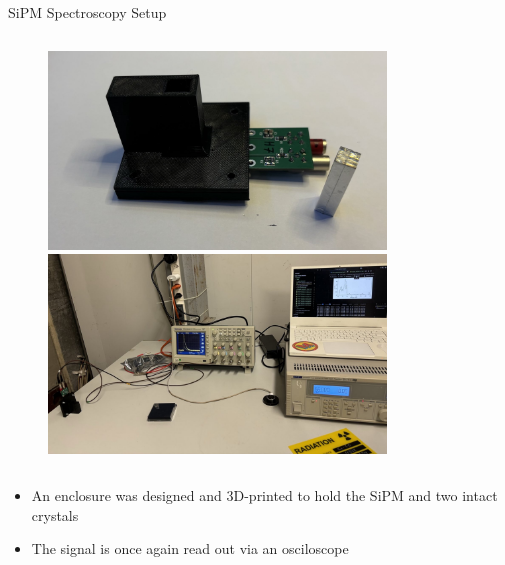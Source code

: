 \begin{columnframe}{SiPM Spectroscopy Setup}
    \begin{column}{0.5\textwidth}
        \begin{figure}
            \centering
            \includegraphics[trim=0 0 0 0, clip, width=0.8\textwidth, frame]{images/pcb_in_enclosure.jpg}
            \includegraphics[trim=0 0 0 0, clip, width=0.8\textwidth, frame]{images/sipm_spectroscopy_setup.jpg}
        \end{figure}
    \end{column}
    \begin{column}{0.5\textwidth}
        \begin{itemize}
            \item An enclosure was designed and 3D-printed to hold the SiPM and two intact crystals
            \item The signal is once again read out via an osciloscope
        \end{itemize}
    \end{column}
\end{columnframe}

